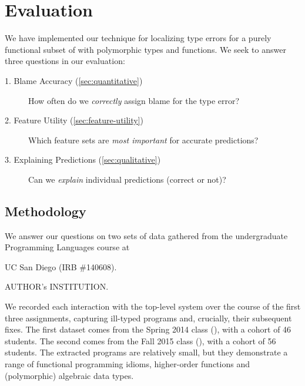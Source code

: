 \section{Evaluation}
\label{sec:evaluation}


We have implemented our technique for localizing type errors for a
purely functional subset of \ocaml with polymorphic types and functions.
%
We seek to answer three questions in our evaluation:
%
\begin{description}
\item[1. Blame Accuracy (\autoref{sec:quantitative})]
  How often do we \emph{correctly} assign blame for the type error?
\item[2. Feature Utility (\autoref{sec:feature-utility})]
  Which feature sets are \emph{most important} for accurate predictions?
\item[3. Explaining Predictions (\autoref{sec:qualitative})]
  Can we \emph{explain} individual predictions (correct or not)?
\end{description}

\subsection{Methodology}
\label{sec:methodology}

We answer our questions on two sets of data gathered from the
undergraduate Programming Languages course at
\begin{anonsuppress}
UC San Diego (IRB \#140608).
\end{anonsuppress}
\begin{noanonsuppress}
AUTHOR's INSTITUTION.
\end{noanonsuppress}
%
We recorded each interaction with the \ocaml top-level system over the
course of the first three assignments, capturing
ill-typed programs and, crucially, their subsequent fixes.
%
The first dataset comes from the Spring 2014 class (\SPRING), with a
cohort of 46 students. The second comes from the Fall 2015 class
(\FALL), with a cohort of 56 students.
%
The extracted programs are relatively small, but they demonstrate a
range of functional programming idioms, \eg higher-order functions and
(polymorphic) algebraic data types.

